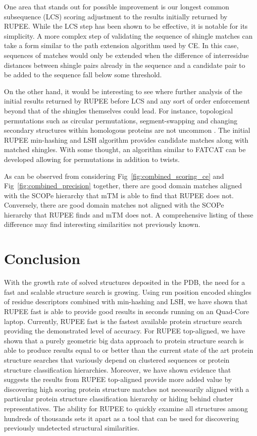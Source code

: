 \documentclass[10pt,letterpaper]{article}
\renewcommand{\figurename}{Fig}
\begin{document}
One area that stands out for possible improvement is our longest common subsequence (LCS) scoring adjustment to the results initially returned by RUPEE. 
While the LCS step has been shown to be effective, it is notable for its simplicity. 
A more complex step of validating the sequence of shingle matches can take a form similar to the path extension algorithm used by CE. 
In this case, sequences of matches would only be extended when the difference of interresidue distances between shingle pairs already in the sequence and a candidate pair to be added to the sequence fall below some threshold.

On the other hand, it would be interesting to see where further analysis of the initial results returned by RUPEE before LCS and any sort of order enforcement beyond that of the shingles themselves could lead. 
For instance, topological permutations such as circular permutations, segment-swapping and changing secondary structures within homologous proteins are not uncommon \cite{Andreeva2007}. 
The initial RUPEE min-hashing and LSH algorithm provides candidate matches along with matched shingles. 
With some thought, an algorithm similar to FATCAT can be developed allowing for permutations in addition to twists. 

As can be observed from considering \figurename~\ref{fig:combined_scoring_ce} and \figurename~\ref{fig:combined_precision} together, there are good domain matches aligned with the SCOPe hierarchy that mTM is able to find that RUPEE does not. 
Conversely, there are good domain matches not aligned with the SCOPe hierarchy that RUPEE finds and mTM does not. 
A comprehensive listing of these difference may find interesting similarities not previously known. 

\section*{Conclusion}

With the growth rate of solved structures deposited in the PDB, the need for a fast and scalable structure search is growing. 
Using run position encoded shingles of residue descriptors combined with min-hashing and LSH, we have shown that RUPEE fast is able to provide good results in seconds running on an Quad-Core laptop.
Currently, RUPEE fast is the fastest available protein structure search providing the demonstrated level of accuracy. 
For RUPEE top-aligned, we have shown that a purely geometric big data approach to protein structure search is able to produce results equal to or better than the current state of the art protein structure searches that variously depend on clustered sequences or protein structure classification hierarchies. 
Moreover, we have shown evidence that suggests the results from RUPEE top-aligned provide more added value by discovering high scoring protein structure matches not necessarily aligned with a particular protein structure classification hierarchy or hiding behind cluster representatives. 
The ability for RUPEE to quickly examine all structures among hundreds of thousands sets it apart as a tool that can be used for discovering previously undetected structural similarities.
\end{document}
